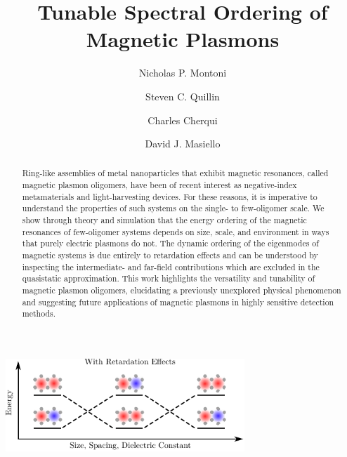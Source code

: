 \documentclass[journal=apchd5,manuscript=article]{achemso}
\author{Nicholas P. Montoni}
\author{Steven C. Quillin}
\author{Charles Cherqui}
\author{David J. Masiello}
\affiliation[Department of Chemistry, University of Washington]
{Department of Chemistry, University of Washington, Seattle, WA 98195}
\title[]
{Tunable Spectral Ordering of Magnetic Plasmons}
\begin{document}
\begin{tocentry}
\includegraphics[width=9cm]{toc_graphic_2.pdf}

\end{tocentry}

\begin{abstract}
Ring-like assemblies of metal nanoparticles that exhibit magnetic resonances, called magnetic plasmon oligomers, have been of recent interest as negative-index metamaterials and light-harvesting devices. For these reasons, it is imperative to understand the properties of such systems on the single- to few-oligomer scale. We show through theory and simulation that the energy ordering of the magnetic resonances of few-oligomer systems depends on size, scale, and environment in ways that purely electric plasmons do not. The dynamic ordering of the eigenmodes of magnetic systems is due entirely to retardation effects and can be understood by inspecting the intermediate- and far-field contributions which are excluded in the quasistatic approximation. This work highlights the versatility and tunability of magnetic plasmon oligomers, elucidating a previously unexplored physical phenomenon and suggesting future applications of magnetic plasmons in highly sensitive detection methods. 
\end{abstract}

\end{document}
